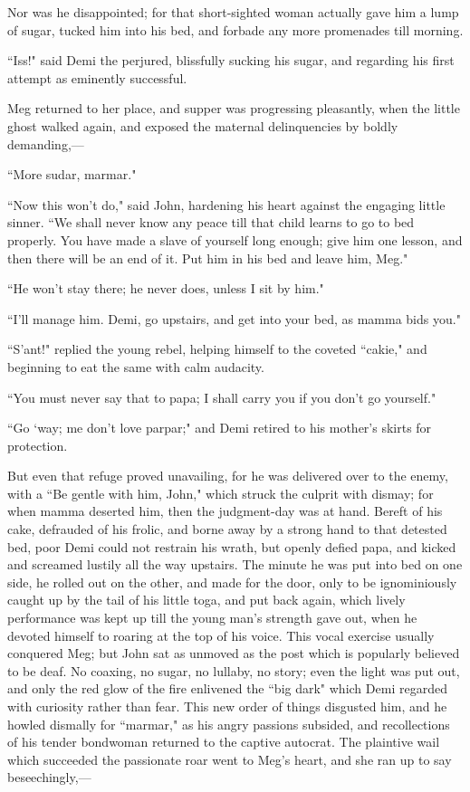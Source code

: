 Nor was he disappointed; for that short-sighted woman actually gave him
a lump of sugar, tucked him into his bed, and forbade any more
promenades till morning.

``Iss!" said Demi the perjured, blissfully sucking his sugar, and
regarding his first attempt as eminently successful.

Meg returned to her place, and supper was progressing pleasantly, when
the little ghost walked again, and exposed the maternal delinquencies by
boldly demanding,---

``More sudar, marmar."

``Now this won't do," said John, hardening his heart
against the engaging little sinner. ``We shall never know any peace till
that child learns to go to bed properly. You have made a slave of
yourself long enough; give him one lesson, and then there will be an end
of it. Put him in his bed and leave him, Meg."

``He won't stay there; he never does, unless I sit by
him."

``I'll manage him. Demi, go upstairs, and get into your
bed, as mamma bids you."

``S'ant!" replied the young rebel, helping himself to the
coveted ``cakie," and beginning to eat the same with calm audacity.

``You must never say that to papa; I shall carry you if you
don't go yourself."

``Go `way; me don't love parpar;" and
Demi retired to his mother's skirts for protection.

But even that refuge proved unavailing, for he was delivered over to the
enemy, with a ``Be gentle with him, John," which struck the culprit with
dismay; for when mamma deserted him, then the judgment-day was at hand.
Bereft of his cake, defrauded of his frolic, and borne away by a strong
hand to that detested bed, poor Demi could not restrain his wrath, but
openly defied papa, and kicked and screamed lustily all the way
upstairs. The minute he was put into bed on one side, he rolled out on
the other, and made for the door, only to be ignominiously caught up by
the tail of his little toga, and put back again, which lively
performance was kept up till the young man's strength
gave out, when he devoted himself to roaring at the top of his voice.
This vocal exercise usually conquered Meg; but John sat as unmoved as
the post which is popularly believed to be deaf. No coaxing, no sugar,
no lullaby, no story; even the light was put out, and only the red glow
of the fire enlivened the ``big dark" which Demi regarded with curiosity
rather than fear. This new order of things disgusted him, and he howled
dismally for ``marmar," as his angry passions subsided, and recollections
of his tender bondwoman returned to the captive autocrat. The plaintive
wail which succeeded the passionate roar went to Meg's
heart, and she ran up to say beseechingly,---

